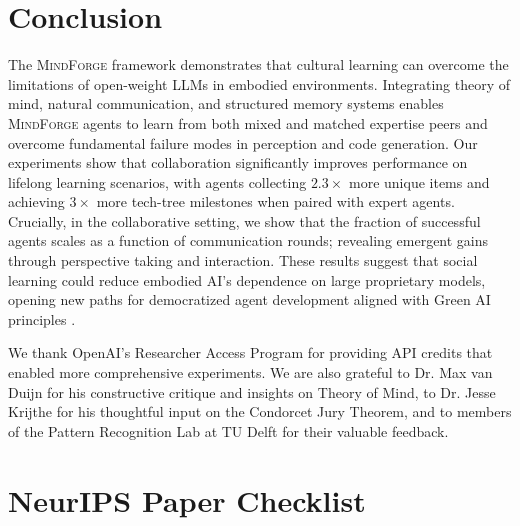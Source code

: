 \documentclass{article}
\newcommand{\collabvoyager}[0]{\mbox{\textsc{MindForge}}\xspace}
\begin{document}
\section{Conclusion}\label{sec:conclusion}

The \collabvoyager framework demonstrates that cultural learning can overcome the limitations of open-weight LLMs in embodied environments. Integrating theory of mind, natural communication, and structured memory systems enables \collabvoyager agents to learn from both mixed and matched expertise peers and overcome fundamental failure modes in perception and code generation. Our experiments show that collaboration significantly improves performance on lifelong learning scenarios, with agents collecting $2.3\times$ more unique items and achieving $3\times$ more tech-tree milestones when paired with expert agents. Crucially, in the collaborative setting, we show that the fraction of successful agents scales as a function of communication rounds; revealing emergent gains through perspective taking and interaction. These results suggest that social learning could reduce embodied AI's dependence on large proprietary models, opening new paths for democratized agent development aligned with Green AI principles \citep{schwartzGreenAI2019}.

\begin{ack}
We thank OpenAI's Researcher Access Program for providing API credits that enabled more comprehensive experiments. We are also grateful to Dr. Max van Duijn for his constructive critique and insights on Theory of Mind, to Dr. Jesse Krijthe for his thoughtful input on the Condorcet Jury Theorem, and to members of the Pattern Recognition Lab at TU Delft for their valuable feedback. 
\end{ack}



\newpage
\section*{NeurIPS Paper Checklist}
\end{document}
